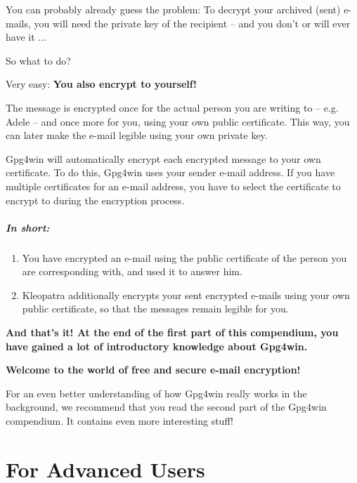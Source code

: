 \documentclass[a4paper,11pt,oneside,openright,titlepage]{scrbook}
\newcommand{\Email}{e-mail}
\begin{document}
You can probably already guess the problem: To decrypt your archived
(sent) \Email{}s, you will need the private key of the recipient --
and you don't or will ever have it ...

So what to do?

Very easy: \textbf{You also encrypt to yourself!}

The message is encrypted once for the actual person you are writing to
-- e.g. Adele -- and once more for you, using your own public
certificate. This way, you can later make the  \Email{} legible using
your own private key.

Gpg4win will automatically encrypt each encrypted message to your own
certificate. To do this, Gpg4win uses your sender \Email{} address. If
you have multiple certificates for an \Email{} address, you have to
select the certificate to encrypt to during the encryption process.

\clearpage
\subsubsection{In short:}

\begin{enumerate}
    \item You have encrypted an \Email{} using the public certificate
        of the person you are corresponding with, and used it to
        answer him.
    \item Kleopatra additionally encrypts your sent encrypted
        \Email{}s using your own public certificate, so that the
        messages remain legible for you.
\end{enumerate}


\vspace{1cm}
\textbf{And that's it! At the end of the first part of this
compendium, you have gained a lot of introductory knowledge about
Gpg4win.}

\textbf{Welcome to the world of free and secure \Email{} encryption!}

For an even better understanding of how Gpg4win really works in the
background, we recommend that you read the second part of the Gpg4win
compendium. It contains even more interesting stuff!


%


\clearpage
\part{For Advanced Users}
\end{document}
